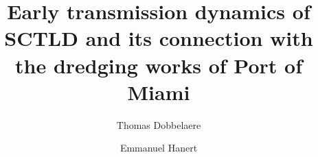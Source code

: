 \documentclass[preprint,12pt,authoryear]{elsarticle}
\begin{document}
\begin{frontmatter}



    \title{Early transmission dynamics of SCTLD and its connection with the dredging works of Port of Miami}%


    \author[eli]{Thomas Dobbelaere}
    \author[eli,immc]{Emmanuel Hanert}


\end{frontmatter}
\end{document}
